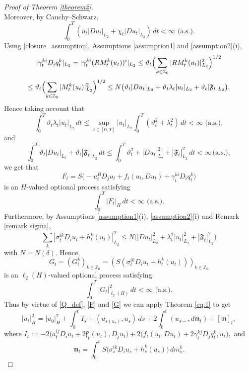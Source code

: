 \documentclass[11pt,reqno]{amsart}
\theoremstyle{definition}
\theoremstyle{remark}
\newcommand\bZ{\mathbb{Z}}
\newcommand\frf{\mathfrak{f}}
\newcommand\frm{\mathfrak{m}}
\newcommand{\<}{\langle}
\renewcommand{\>}{\rangle}
\begin{document}
\begin{proof}[Proof of Theorem \ref{theorem2}]
\begin{equation*}
\end{equation*}
Moreover, by Cauchy--Schwarz,
$$
\int_0^T(\bar u_t|Du_t|_{L_2}+\chi_t|Du_t|_{L_2})\,dt
<\infty \,\,\text{(a.s.)}.
$$
Using \eqref{closure_assumption}, Assumptions \ref{assumption1} and 
\ref{assumption2}(i),
$$
|\gamma_t^{ki}D_i q_t^k|_{L_2}
=
|\gamma_t^{ki}(RM_t^k(u_t))^i|_{L_2}
\le
\vartheta_t
\Bigl(
\sum_{k\in\bZ_0} |RM_t^k(u_t)|_{L_2}^2
\Bigr)^{1/2}
$$
$$
\leq
\vartheta_t
\Bigl(
\sum_{k\in\bZ_0} |M_t^k(u_t)|_{L_2}^2
\Bigr)^{1/2}
\leq
N\bigl(
\vartheta_t|Du_t|_{L_2}
+\vartheta_t\lambda_t|u_t|_{L_2}
+\vartheta_t|\mathfrak{F}_t|_{L_2}\big). 
$$
Hence taking account that 
\begin{equation*}
\int_0^T
\vartheta_t\lambda_t|u_t|_{L_2}\,dt
\le
\sup_{t\in[0,T]}|u_t|_{L_2}
\int_0^T(\vartheta_t^2+\lambda_t^2)\,dt
<\infty\,\,\text{(a.s.)},
\end{equation*}
and 
$$
\int_0^T\vartheta_t|Du_t|_{L_2}
+
\vartheta_t|\mathfrak{F}_t|_{L_2}\,dt
\leq 
\int_0^T\vartheta_t^2+|Du_t|^2_{L_2}+|\mathfrak{F}_t|^2_{L_2}\,dt
<\infty\,\text{(a.s.)}, 
$$
we get that 
\[
F_t
=
S\bigl(
-u_t^BD_j u_t
+f_t(u_t,Du_t)
+\gamma_t^{ki}D_i q_t^k
\bigr)
\]
is an $H$-valued optional process satisfying
\begin{equation}
                                                              \label{F}
\int_0^T |F_t|_H\,dt<\infty\,\,\text{(a.s.)}.
\end{equation}
Furthermore, by Assumptions \ref{assumption1}(i), \ref{assumption2}(i) 
and Remark \ref{remark sigma},
$$
\sum_k
|\sigma_t^{ik}D_i u_t+h_t^k(u_t)|_{L_2}^2
\leq
N\bigl(
|Du_t|_{L_2}^2+\lambda_t^2|u_t|_{L_2}^2
+|\mathfrak{F}_t|_{L_2}^2 
\big)
$$
with $N=N(\delta)$. Hence, 
$$
G_t=(G_t^k)_{k\in\bZ_0}=(S(\sigma_t^{ik}D_i u_t+h_t^k(u_t)))_{k\in\bZ_0}
$$
is an $\ell_2(H)$-valued optional process satisfying
\begin{equation}
                                            \label{G}
\int_0^T |G_t|_{\ell_2(H)}^2\,dt<\infty\,\,\text{(a.s.)}.
\end{equation}
Thus by virtue of \eqref{Q_def}, \eqref{F} and 
\eqref{G} we can apply Theorem \ref{eq:1} to get
\begin{equation}
                              \label{ito_sns}
|u_t|_H^2=|u_0|_H^2+\int_0^tI_s+(u_{s(u_s)},u_s)\,ds
+2 \int^{t}_{0} (u_{s-},d\frm_t)+[\frm]_t,
\end{equation}
where 
$
I_t:=-2\big(a_t^{ij}D_i u_t+2\frf_t^i(u_t),D_j u_t\big)
+2\big(f_t(u_t,Du_t)+2\gamma_t^{kj}D_j q_t^k,u_t\big), 
$
and 
$$
\frm_t=\int_0^tS\big(\sigma_s^{ik}D_i u_s+h_s^k(u_s)\big)\,dm_s^k. 
$$
\end{proof}
\end{document}
